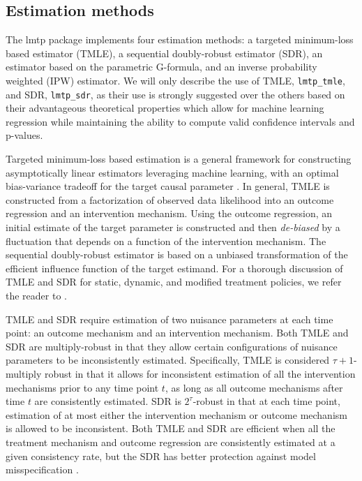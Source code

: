 \documentclass[twoside,11pt]{article}
\newcommand{\pkg}[1]{{\fontseries{b}\selectfont #1}}
\let\code=\texttt
\begin{document}
\hypertarget{estimation-methods}{\subsection{Estimation methods}\label{estimation-methods}}

The \pkg{lmtp} package implements four estimation methods: a targeted minimum-loss based estimator (TMLE), a sequential doubly-robust estimator (SDR), an estimator based on the parametric G-formula, and an inverse probability weighted (IPW) estimator. We will only describe the use of TMLE, \code{lmtp\_tmle}, and SDR, \code{lmtp\_sdr}, as their use is strongly suggested over the others based on their advantageous theoretical properties which allow for machine learning regression while maintaining the ability to compute valid confidence intervals and p-values.

Targeted minimum-loss based estimation is a general framework for constructing asymptotically linear estimators leveraging machine learning, with an optimal bias-variance tradeoff for the target causal parameter \citep{vanderLaanRose11, vanderLaanRose18}. In general, TMLE is constructed from a factorization of observed data likelihood into an outcome regression and an intervention mechanism. Using the outcome regression, an initial estimate of the target parameter is constructed and then \textit{de-biased} by a fluctuation that depends on a function of the intervention mechanism. The sequential doubly-robust estimator is based on a unbiased transformation of the efficient influence function of the target estimand. For a thorough discussion of TMLE and SDR for static, dynamic, and modified treatment policies, we refer the reader to \cite{van2011targeted,luedtke2017sequential,rotnitzky2017multiply,jasaLMTP}.

TMLE and SDR require estimation of two nuisance parameters at each time point: an outcome mechanism and an intervention mechanism. Both TMLE and SDR are multiply-robust in that they allow certain configurations of nuisance parameters to be inconsistently estimated. Specifically, TMLE is considered $\tau + 1$-multiply robust in that it allows for inconsistent estimation of all the intervention mechanisms prior to any time point $t$, as long as all outcome mechanisms after time $t$ are consistently estimated. SDR is $2^{\tau}$-robust in that at each time point, estimation of at most either the intervention mechanism or outcome mechanism is allowed to be inconsistent. Both TMLE and SDR are efficient when all the treatment mechanism and outcome regression are consistently estimated at a given consistency rate, but the SDR has better protection against model misspecification \citep[see][for more details]{luedtke2017sequential,rotnitzky2017multiply, jasaLMTP}.
\end{document}
